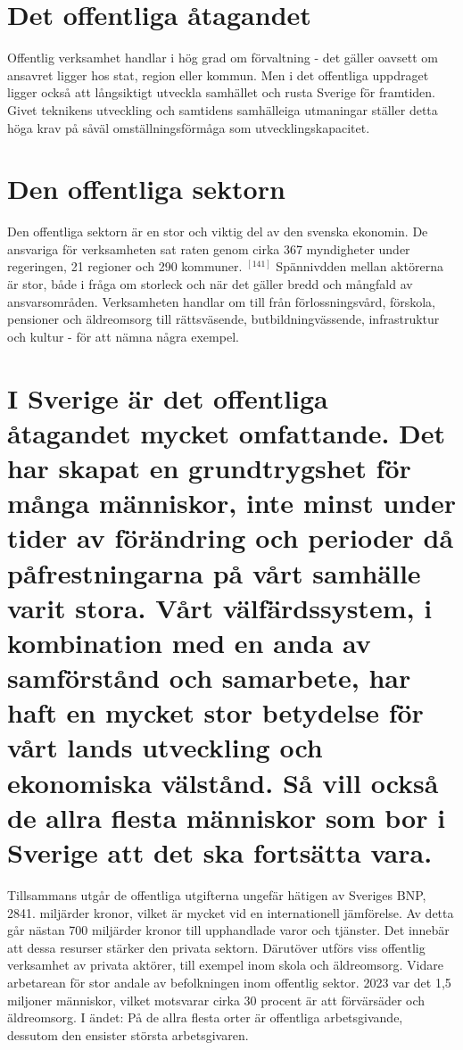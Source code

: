 \section*{Det offentliga åtagandet}
Offentlig verksamhet handlar i hög grad om förvaltning - det gäller oavsett om ansavret ligger hos stat, region eller kommun. Men i det offentliga uppdraget ligger också att långsiktigt utveckla samhället och rusta Sverige för framtiden. Givet teknikens utveckling och samtidens samhälleiga utmaningar ställer detta höga krav på såväl omställningsförmåga som utvecklingskapacitet.
\section*{Den offentliga sektorn}
Den offentliga sektorn är en stor och viktig del av den svenska ekonomin. De ansvariga för verksamheten sat raten genom cirka 367 myndigheter under regeringen, 21 regioner och 290 kommuner. \({ }^{[141]}\) Spännivdden mellan aktörerna är stor, både i fråga om storleck och när det gäller bredd och mångfald av ansvarsområden. Verksamheten handlar om till från förlossningsvård, förskola, pensioner och äldreomsorg till rättsväsende, butbildningvässende, infrastruktur och kultur - för att nämna några exempel.
\section*{I Sverige är det offentliga åtagandet mycket omfattande. Det har skapat en grundtrygshet för många människor, inte minst under tider av förändring och perioder då påfrestningarna på vårt samhälle varit stora. Vårt välfärdssystem, i kombination med en anda av samförstånd och samarbete, har haft en mycket stor betydelse för vårt lands utveckling och ekonomiska välstånd. Så vill också de allra flesta människor som bor i Sverige att det ska fortsätta vara.}
Tillsammans utgår de offentliga utgifterna ungefär hätigen av Sveriges BNP, 2841. miljärder kronor, vilket är mycket vid en internationell jämförelse. Av detta går nästan 700 miljärder kronor till upphandlade varor och tjänster. Det innebär att dessa resurser stärker den privata sektorn. Därutöver utförs viss offentlig verksamhet av privata aktörer, till exempel inom skola och äldreomsorg. Vidare arbetarean för stor andale av befolkningen inom offentlig sektor. 2023 var det 1,5 miljoner människor, vilket motsvarar cirka 30 procent är att förvärsäder och äldreomsorg. I ändet: På de allra flesta orter är offentliga arbetsgivande, dessutom den ensister största arbetsgivaren.

